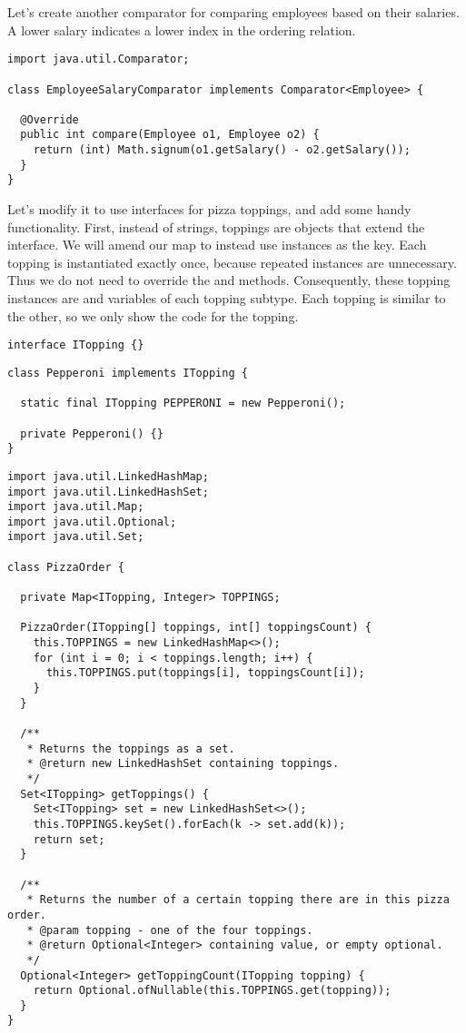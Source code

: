 Let's create another comparator for comparing employees based on their salaries. 
A lower salary indicates a lower index in the ordering relation.

\begin{lstlisting}[language=MyJava]
import java.util.Comparator;

class EmployeeSalaryComparator implements Comparator<Employee> {

  @Override
  public int compare(Employee o1, Employee o2) {
    return (int) Math.signum(o1.getSalary() - o2.getSalary());
  }
}
\end{lstlisting}

Let's modify it to use interfaces for pizza toppings, and add some handy functionality.
First, instead of strings, toppings are objects that extend the  interface.
We will amend our map to instead use  instances as the key.
Each topping is instantiated exactly once, because repeated instances are unnecessary.
Thus we do not need to override the  and  methods.
Consequently, these topping instances are  and  variables of each topping subtype.
Each topping is similar to the other, so we only show the code for the  topping.

\begin{lstlisting}[language=MyJava]
interface ITopping {}
\end{lstlisting}

\begin{lstlisting}[language=MyJava]
class Pepperoni implements ITopping {

  static final ITopping PEPPERONI = new Pepperoni();

  private Pepperoni() {}
}
\end{lstlisting}

\begin{lstlisting}[language=MyJava]
import java.util.LinkedHashMap;
import java.util.LinkedHashSet;
import java.util.Map;
import java.util.Optional;
import java.util.Set;

class PizzaOrder {
  
  private Map<ITopping, Integer> TOPPINGS;

  PizzaOrder(ITopping[] toppings, int[] toppingsCount) {
    this.TOPPINGS = new LinkedHashMap<>();
    for (int i = 0; i < toppings.length; i++) {
      this.TOPPINGS.put(toppings[i], toppingsCount[i]);
    }
  }

  /**
   * Returns the toppings as a set.
   * @return new LinkedHashSet containing toppings.
   */
  Set<ITopping> getToppings() {
    Set<ITopping> set = new LinkedHashSet<>();
    this.TOPPINGS.keySet().forEach(k -> set.add(k));
    return set;
  }

  /**
   * Returns the number of a certain topping there are in this pizza order.
   * @param topping - one of the four toppings.
   * @return Optional<Integer> containing value, or empty optional.
   */
  Optional<Integer> getToppingCount(ITopping topping) {
    return Optional.ofNullable(this.TOPPINGS.get(topping));
  }
}
\end{lstlisting}

